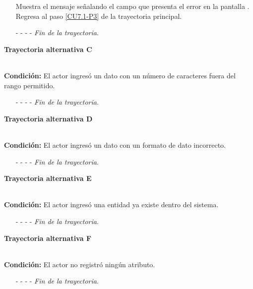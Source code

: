 \begin{enumerate}
	\UCpaso[\UCsist] Muestra el mensaje  señalando el campo que presenta el error en la pantalla .
	\UCpaso Regresa al paso \ref{CU7.1-P3} de la trayectoria principal.
	\item[- -] - - {\em {Fin de la trayectoria}}.%
\end{enumerate}
\hypertarget{CU7-1:TAC}{\textbf{Trayectoria alternativa C}}\\
\noindent \textbf{Condición:} El actor ingresó un dato con un número de caracteres fuera del rango permitido.
\begin{enumerate}
	\UCpaso[\UCsist] Muestra el mensaje  señalando el campo que presenta el error en la pantalla .
	\UCpaso Regresa al paso \ref{CU7.1-P3} de la trayectoria principal.
	\item[- -] - - {\em {Fin de la trayectoria}}.%
\end{enumerate}
\hypertarget{CU7-1:TAD}{\textbf{Trayectoria alternativa D}}\\
\noindent \textbf{Condición:} El actor ingresó un dato con un formato de dato incorrecto.
\begin{enumerate}
	\UCpaso[\UCsist] Muestra el mensaje  señalando el campo que presenta el error en la pantalla .
	\UCpaso Regresa al paso \ref{CU7.1-P3} de la trayectoria principal.
	\item[- -] - - {\em {Fin de la trayectoria}}.
\end{enumerate}
\hypertarget{CU7-1:TAE}{\textbf{Trayectoria alternativa E}}\\
\noindent \textbf{Condición:} El actor ingresó una entidad ya existe dentro del sistema.
\begin{enumerate}
	\UCpaso[\UCsist] Muestra el mensaje  señalando el campo que presenta la duplicidad en la pantalla .
	\UCpaso Regresa al paso \ref{CU7.1-P3} de la trayectoria principal.
	\item[- -] - - {\em {Fin de la trayectoria}}.
\end{enumerate}
\hypertarget{CU7-1:TAF}{\textbf{Trayectoria alternativa F}}\\
\noindent \textbf{Condición:} El actor no registró ningún atributo.
\begin{enumerate}
	\UCpaso[\UCsist] Muestra el mensaje  en la sección de atributos de la pantalla .
	\UCpaso Regresa al paso \ref{CU7.1-P3} de la trayectoria principal.
	\item[- -] - - {\em {Fin de la trayectoria}}.
\end{enumerate}
